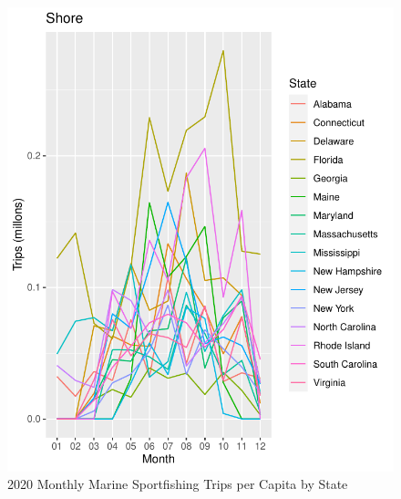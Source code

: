 \documentclass[10pt,letterpaper]{article}
\begin{document}
\begin{figure}

{\centering \includegraphics{C19PolicyRec_files/figure-latex/pTrips-3} 

}

\caption{2020 Monthly Marine Sportfishing Trips per Capita by State}\label{fig:pTrips-3}
\end{figure}
\end{document}
